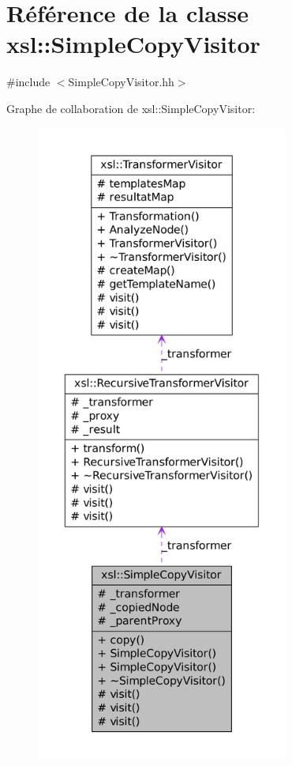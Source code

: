 \hypertarget{classxsl_1_1_simple_copy_visitor}{
\section{Référence de la classe xsl::SimpleCopyVisitor}
\label{classxsl_1_1_simple_copy_visitor}
}


{\ttfamily \#include $<$SimpleCopyVisitor.hh$>$}



Graphe de collaboration de xsl::SimpleCopyVisitor:
\nopagebreak
\begin{figure}[H]
\begin{center}
\leavevmode
\includegraphics[height=600pt]{classxsl_1_1_simple_copy_visitor__coll__graph}
\end{center}
\end{figure}

